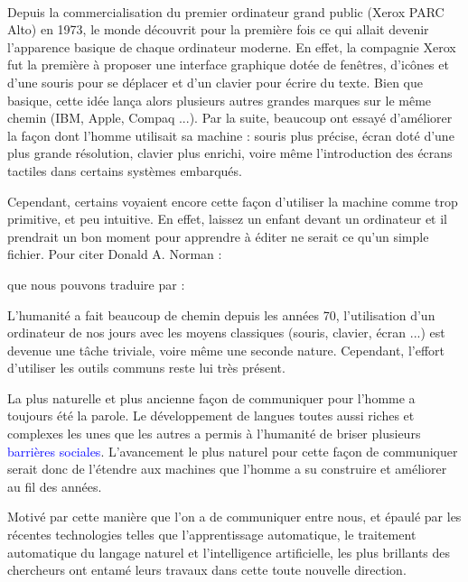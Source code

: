 \paragraph{}
Depuis la commercialisation du premier ordinateur grand public (Xerox PARC Alto) en 1973, le monde découvrit pour la première fois ce qui allait devenir l'apparence basique de chaque ordinateur moderne. En effet, la compagnie Xerox fut la première à proposer une interface graphique dotée de fenêtres, d'icônes et d'une souris pour se déplacer et d'un clavier pour écrire du texte. Bien que basique, cette idée lança alors plusieurs autres grandes marques sur le même chemin (IBM, Apple, Compaq ...). Par la suite, beaucoup ont essayé d'améliorer la façon dont l'homme utilisait sa machine : souris plus précise, écran doté d'une plus grande résolution, clavier plus enrichi, voire même l'introduction des écrans tactiles dans certains systèmes embarqués.
\par Cependant, certains voyaient encore cette façon d'utiliser la machine comme trop primitive, et peu intuitive. En effet, laissez un enfant devant un ordinateur et il prendrait un bon moment pour apprendre à éditer ne serait ce qu'un simple fichier. Pour citer Donald A. Norman \citep{don_norman} :
\begin{quote}
\end{quote}
que nous pouvons traduire par :
\begin{quote}
\end{quote} 
L'humanité a fait beaucoup de chemin depuis les années 70, l'utilisation d'un ordinateur de nos jours avec les moyens classiques (souris, clavier, écran ...) est devenue une tâche triviale, voire même une seconde nature. Cependant, l'effort d'utiliser les outils communs reste lui très présent.
\par La plus naturelle et plus ancienne façon de communiquer pour l'homme a toujours été la parole. Le développement de langues toutes aussi riches et complexes les unes que les autres a permis à l'humanité de briser plusieurs \textcolor{blue}{barrières sociales}. L'avancement le plus naturel pour cette façon de communiquer serait donc de l'étendre aux machines que l'homme a su construire et améliorer au fil des années.
\par 
Motivé par cette manière que l'on a de communiquer entre nous, et épaulé par les récentes technologies telles que l'apprentissage automatique, le traitement automatique du langage naturel et l'intelligence artificielle, les plus brillants des chercheurs ont entamé leurs travaux dans cette toute nouvelle direction.
